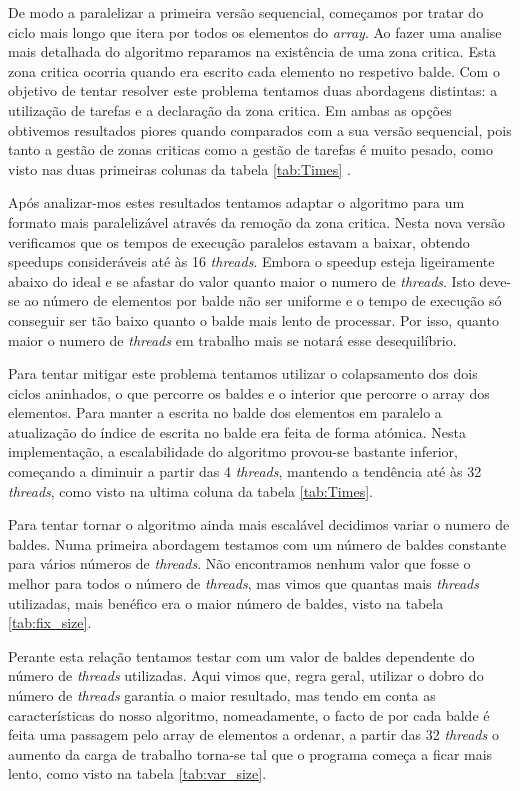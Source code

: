 \documentclass[a4paper]{report}
\begin{document}
De modo a paralelizar a primeira versão sequencial, começamos por tratar do
ciclo mais longo que itera por todos os elementos do \textit{array}. Ao fazer
uma analise mais detalhada do algoritmo reparamos na existência de uma zona
critica. Esta zona critica ocorria quando era escrito cada elemento no respetivo
balde. Com o objetivo de tentar resolver este problema tentamos duas abordagens
distintas: a utilização de tarefas e a declaração da zona critica. Em ambas as
opções obtivemos resultados piores quando comparados com a sua versão
sequencial, pois tanto a gestão de zonas criticas como a gestão de tarefas é
muito pesado, como visto nas duas primeiras colunas da tabela \ref{tab:Times} .

Após analizar-mos estes resultados tentamos adaptar o algoritmo para um formato
mais paralelizável através da remoção da zona critica. Nesta nova versão
verificamos que os tempos de execução paralelos estavam a baixar, obtendo
speedups consideráveis até às 16 \textit{threads}. Embora o speedup esteja
ligeiramente abaixo do ideal e se afastar do valor quanto maior o numero de
\textit{threads}. Isto deve-se ao número de elementos por balde não ser uniforme
e o tempo de execução só conseguir ser tão baixo quanto o balde mais lento de
processar. Por isso, quanto maior o numero de \textit{threads} em trabalho mais
se notará esse desequilíbrio.

Para tentar mitigar este problema tentamos utilizar o colapsamento dos dois
ciclos aninhados, o que percorre os baldes e o interior que percorre o array dos
elementos. Para manter a escrita no balde dos elementos em paralelo a
atualização do índice de escrita no balde era feita de forma atómica. Nesta
implementação, a escalabilidade do algoritmo provou-se bastante inferior,
começando a diminuir a partir das 4 \textit{threads}, mantendo a tendência até
às 32 \textit{threads}, como visto na ultima coluna da tabela \ref{tab:Times}.

Para tentar tornar o algoritmo ainda mais escalável decidimos variar o numero
de baldes. Numa primeira abordagem testamos com um número de baldes constante
para vários números de \textit{threads}. Não encontramos nenhum valor que fosse
o melhor para todos o número de \textit{threads}, mas vimos que quantas mais
\textit{threads} utilizadas, mais benéfico era o maior número de baldes, visto
na tabela \ref{tab:fix_size}.

Perante esta relação tentamos testar com um valor de baldes dependente do número
de \textit{threads} utilizadas. Aqui vimos que, regra geral, utilizar o dobro do
número de \textit{threads} garantia o maior resultado, mas tendo em conta as
características do nosso algoritmo, nomeadamente, o facto de por cada balde é
feita uma passagem pelo array de elementos a ordenar, a partir das 32
\textit{threads} o aumento da carga de trabalho torna-se tal que o programa
começa a ficar mais lento, como visto na tabela \ref{tab:var_size}.
\end{document}
